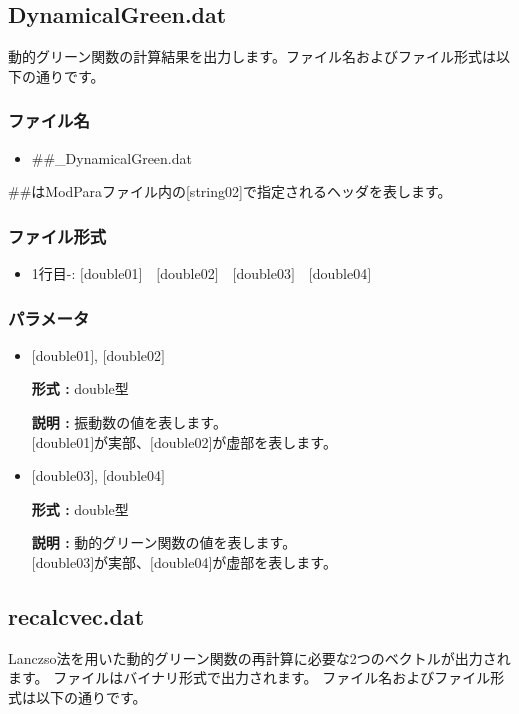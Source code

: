 \newpage
\subsection{{DynamicalGreen.dat}}
\label{Subsec:dynamicalG}
動的グリーン関数の計算結果を出力します。ファイル名およびファイル形式は以下の通りです。

\subsubsection{ファイル名}
\begin{itemize}
   \item{\#\#\_DynamicalGreen.dat}
\end{itemize}
  \#\#はModParaファイル内の[string02]で指定されるヘッダを表します。
  
\subsubsection{ファイル形式}
 \begin{itemize}
   \item  1行目-: $[$double01$]$~~$[$double02$]$~~$[$double03$]$~~$[$double04$]$
  \end{itemize}
\subsubsection{パラメータ}
 \begin{itemize}

 \item  $[$double01$]$, $[$double02$]$

 {\bf 形式 :} double型 

 {\bf 説明 :} 振動数の値を表します。\\
$[$double01$]$が実部、$[$double02$]$が虚部を表します。\\

 \item  $[$double03$]$, $[$double04$]$

 {\bf 形式 :} double型 

 {\bf 説明 :} 動的グリーン関数の値を表します。\\
$[$double03$]$が実部、$[$double04$]$が虚部を表します。\\

\end{itemize}


\newpage
\subsection{{recalcvec.dat}}
Lanczso法を用いた動的グリーン関数の再計算に必要な2つのベクトルが出力されます。
ファイルはバイナリ形式で出力されます。
ファイル名およびファイル形式は以下の通りです。

